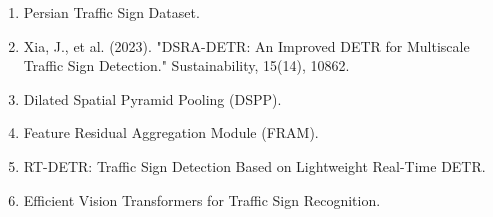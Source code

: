 \begin{LTR}
\begin{latin}
\begin{enumerate}
    \item \label{ref:IranDataset} Persian Traffic Sign Dataset.
    \item \label{ref:Xia} Xia, J., et al. (2023). "DSRA-DETR: An Improved DETR for Multiscale Traffic Sign Detection." Sustainability, 15(14), 10862.
    \item \label{ref:DSPP} Dilated Spatial Pyramid Pooling (DSPP).
    \item \label{ref:FRAM} Feature Residual Aggregation Module (FRAM).
    \item \label{ref:RTDETR} RT-DETR: Traffic Sign Detection Based on Lightweight Real-Time DETR.
    \item \label{ref:EfficientViT} Efficient Vision Transformers for Traffic Sign Recognition.
\end{enumerate}
\end{latin}

\end{LTR}





